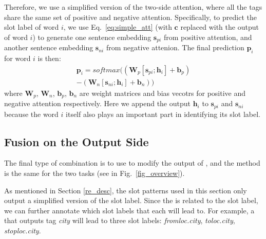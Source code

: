 Therefore, we use a simplified version of the two-side attention, where all the tags share the same set of positive and negative attention.
Specifically, to predict the slot label of word $i$, we use Eq.~\ref{eq:simple_att} (with $\textbf{c}$ replaced with the \BLSTM output of word $i$) to generate one sentence embedding $\textbf{s}_{pi}$ from positive attention, and another sentence embedding $\textbf{s}_{ni}$ from negative attenion.
The final prediction $\textbf{p}_i$ for word $i$ is then:
\begin{equation}
\begin{split}
\textbf{p}_i = softmax((\textbf{W}_p [\textbf{s}_{pi}; \textbf{h}_i] + \textbf{b}_p) \\- (\textbf{W}_n [\textbf{s}_{ni}; \textbf{h}_i] + \textbf{b}_n))
\end{split}
\end{equation}
where $\textbf{W}_{p}$, $\textbf{W}_{n}$, $\textbf{b}_{p}$, $\textbf{b}_{n}$ are weight matrices and bias vecotrs for positive and negative attention respectively. Here we append the \BLSTM output $\textbf{h}_i$ to $\textbf{s}_{pi}$ and $\textbf{s}_{ni}$ because the word $i$ itself also plays an important part in identifying its slot label.

\subsection{Fusion on the Output Side}
\label{fusion_with_output}
The final type of combination is to use \RE to modify the output of \NN, and the method is the same for the two tasks (see  in Fig.~\ref{fig_overview}).


As mentioned in Section \ref{re_desc}, the slot \RE patterns used in this section only output a simplified version of the slot label.
Since the \REtag is related to the slot label, we can further annotate which slot labels that each \RE will lead to.
For example, a \RE that outputs tag \emph{city} will lead to three slot labels: \emph{fromloc.city}, \emph{toloc.city}, \emph{stoploc.city}.

